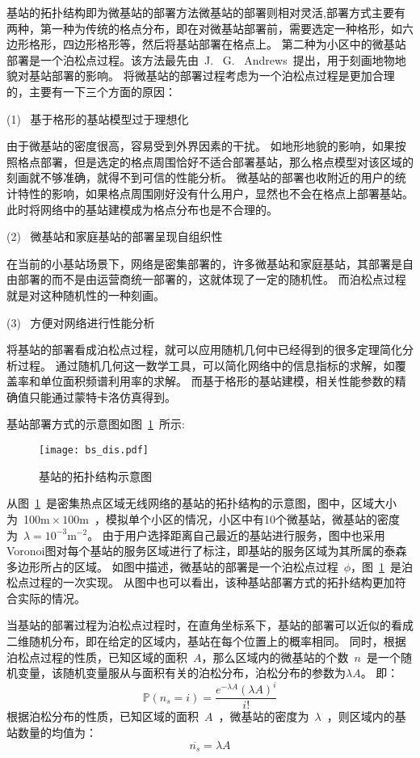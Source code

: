 基站的拓扑结构即为微基站的部署方法微基站的部署则相对灵活,部署方式主要有两种，第一种为传统的格点分布，即在对微基站部署前，需要选定一种格形，如六边形格形，四边形格形等，然后将基站部署在格点上。
第二种为小区中的微基站部署是一个泊松点过程。该方法最先由~J.~ G.~ Andrews~提出，用于刻画地物地貌对基站部署的影响。
将微基站的部署过程考虑为一个泊松点过程是更加合理的，主要有一下三个方面的原因：

(1)~ 基于格形的基站模型过于理想化

由于微基站的密度很高，容易受到外界因素的干扰。
如地形地貌的影响，如果按照格点部署，但是选定的格点周围恰好不适合部署基站，那么格点模型对该区域的刻画就不够准确，就得不到可信的性能分析。
微基站的部署也收附近的用户的统计特性的影响，如果格点周围刚好没有什么用户，显然也不会在格点上部署基站。
此时将网络中的基站建模成为格点分布也是不合理的。

(2)~ 微基站和家庭基站的部署呈现自组织性

在当前的小基站场景下，网络是密集部署的，许多微基站和家庭基站，其部署是自由部署的而不是由运营商统一部署的，这就体现了一定的随机性。
而泊松点过程就是对这种随机性的一种刻画。

(3)~ 方便对网络进行性能分析

将基站的部署看成泊松点过程，就可以应用随机几何中已经得到的很多定理简化分析过程。
通过随机几何这一数学工具，可以简化网络中的信息指标的求解，如覆盖率和单位面积频谱利用率的求解。
而基于格形的基站建模，相关性能参数的精确值只能通过蒙特卡洛仿真得到。

基站部署方式的示意图如图~\ref{bs_dis}~所示:
\begin{figure}[htbp]
\centering
\texttt{[image: bs\_dis.pdf]}
\caption{基站的拓扑结构示意图}\vspace{-0.5em}
\label{bs_dis}
\end{figure}


从图~\ref{bs_dis}~是密集热点区域无线网络的基站的拓扑结构的示意图，图中，区域大小为~100$\mathrm{m}\times 100\mathrm{m}$~，模拟单个小区的情况，小区中有10个微基站，微基站的密度为~$\lambda=10^{-3}\mathrm{m}^{-2}$。
由于用户选择距离自己最近的基站进行服务，图中也采用Voronoi图对每个基站的服务区域进行了标注，即基站的服务区域为其所属的泰森多边形所占的区域。
如图中描述，微基站的部署是一个泊松点过程~$\phi$，图~\ref{bs_dis}~是泊松点过程的一次实现。
从图中也可以看出，该种基站部署方式的拓扑结构更加符合实际的情况。

当基站的部署过程为泊松点过程时，在直角坐标系下，基站的部署可以近似的看成二维随机分布，即在给定的区域内，基站在每个位置上的概率相同。
同时，根据泊松点过程的性质，已知区域的面积~$A$，那么区域内的微基站的个数~$n$~是一个随机变量，该随机变量服从与面积有关的泊松分布，泊松分布的参数为$\lambda A$。
即：
\begin{equation}
  \mathbb{P}(n_s = i) = \frac{e^{-\lambda A}(\lambda A)^{i}}{i!}
\end{equation}
根据泊松分布的性质，已知区域的面积~$A$~，微基站的密度为~$\lambda$~，则区域内的基站数量的均值为：
\begin{equation}\label{n_s_bar}
  \overline{n_s} = \lambda A
\end{equation}

